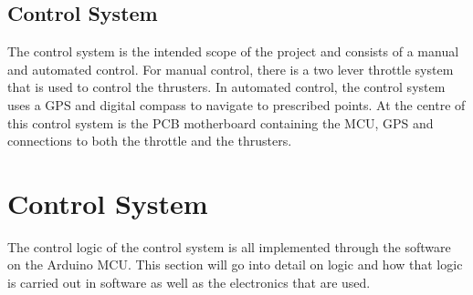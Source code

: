 \subsection{Control System}
The control system is the intended scope of the project and consists of a manual and automated control. For manual control, there is a two lever throttle system that is used to control the thrusters. In automated control, the control system uses a GPS and digital compass to navigate to prescribed points. At the centre of this control system is the PCB motherboard containing the MCU, GPS and connections to both the throttle and the thrusters. 
\section{Control System}
The control logic of the control system is all implemented through the software on the Arduino MCU. This section will go into detail on logic and how that logic is carried out in software as well as the electronics that are used. 
